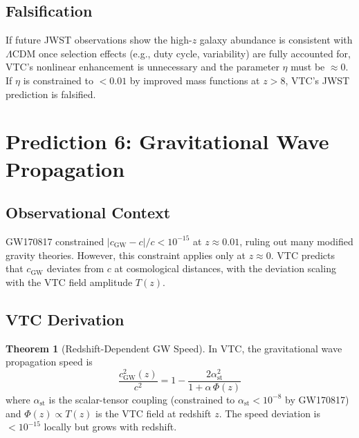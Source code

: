 \documentclass[11pt,a4paper]{article}
\theoremstyle{definition}
\newtheorem{theorem}{Theorem}[section]
\begin{document}
\subsection{Falsification}

If future JWST observations show the high-$z$ galaxy abundance is consistent with $\Lambda$CDM once selection effects (e.g., duty cycle, variability) are fully accounted for, VTC's nonlinear enhancement is unnecessary and the parameter $\eta$ must be $\approx 0$. If $\eta$ is constrained to $< 0.01$ by improved mass functions at $z > 8$, VTC's JWST prediction is falsified.

\section{Prediction 6: Gravitational Wave Propagation}
\label{sec:p6}

\subsection{Observational Context}

GW170817 constrained $|c_\mathrm{GW} - c|/c < 10^{-15}$ at $z \approx 0.01$, ruling out many modified gravity theories. However, this constraint applies only at $z \approx 0$. VTC predicts that $c_\mathrm{GW}$ deviates from $c$ at cosmological distances, with the deviation scaling with the VTC field amplitude $T(z)$.

\subsection{VTC Derivation}

\begin{theorem}[Redshift-Dependent GW Speed]
\label{thm:p6}
In VTC, the gravitational wave propagation speed is
\begin{equation}
\frac{c_\mathrm{GW}^2(z)}{c^2} = 1 - \frac{2\alpha_\mathrm{st}^2}{1 + \alpha\,\Phi(z)}
\end{equation}
where $\alpha_\mathrm{st}$ is the scalar-tensor coupling (constrained to $\alpha_\mathrm{st} < 10^{-8}$ by GW170817) and $\Phi(z) \propto T(z)$ is the VTC field at redshift $z$. The speed deviation is $< 10^{-15}$ locally but grows with redshift.
\end{theorem}
\end{document}
